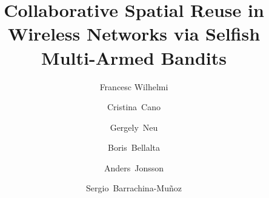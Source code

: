 \documentclass[preprint,12pt]{elsarticle}
\begin{document}
	
	\begin{frontmatter}
		
		
		
		\title{Collaborative Spatial Reuse in Wireless Networks via Selfish Multi-Armed Bandits}
		
		\author[label1, label4]{Francesc Wilhelmi}
		\author[label2]{Cristina~Cano}
		\author[label3]{Gergely~Neu}
		\author[label1]{Boris~Bellalta} 
		\author[label3]{Anders~Jonsson}
		\author[label1]{Sergio~Barrachina-Mu\~noz}
		\address[label1]{Wireless Networking Research Group (WN-UPF), 08018 Barcelona, Spain}
		\address[label2]{Wireless Networks Research Group (WINE-UOC), 08860 Castelldefels (Barelona), Spain}
		\address[label3]{Artificial Intelligence and Machine Learning Research Group (AIML-UPF), 08018 Barcelona, Spain}
		

\end{frontmatter}
\end{document}

